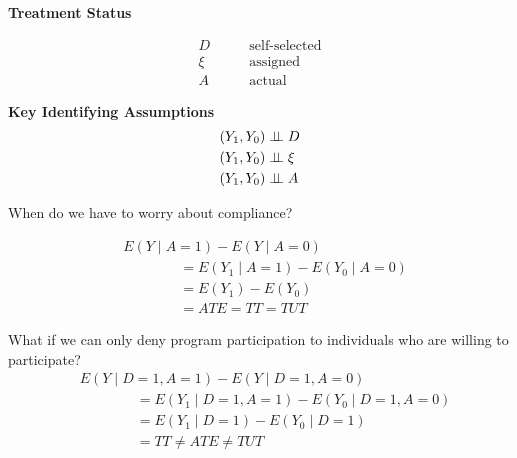 \begin{frame}\textbf{Treatment Status}

\begin{align*}
D &\qquad \text{self-selected} \\
\xi &\qquad \text{assigned} \\
A &\qquad  \text{actual}
\end{align*}
\end{frame}
\begin{frame}\textbf{Key Identifying Assumptions}
\begin{align*}
(Y_1, Y_0) & \indep D \\
(Y_1, Y_0) & \indep \xi \\
(Y_1, Y_0) & \indep A
\end{align*}

When do we have to worry about compliance?

\end{frame}
\begin{frame}
\begin{align*}
& E(Y\mid A = 1) - E(Y\mid A = 0) \\
& \qquad\qquad = E(Y_1\mid A = 1) - E(Y_0\mid A = 0)  \tag{by full compliance} \\
& \qquad\qquad = E(Y_1) - E(Y_0)  \tag{by randomization} \\
& \qquad\qquad = ATE = TT = TUT
\end{align*}
\end{frame}
\begin{frame}
What if we can only deny program participation to individuals who are willing to participate?
\begin{align*}
& E(Y\mid D= 1, A = 1) - E(Y\mid D = 1, A = 0) \\
& \qquad\qquad = E(Y_1\mid D= 1, A = 1) - E(Y_0\mid D=1, A = 0) \\
& \qquad\qquad = E(Y_1\mid D = 1) - E(Y_0 \mid D = 1)  \\
& \qquad\qquad = TT \neq ATE \neq TUT
\end{align*}
\end{frame}
